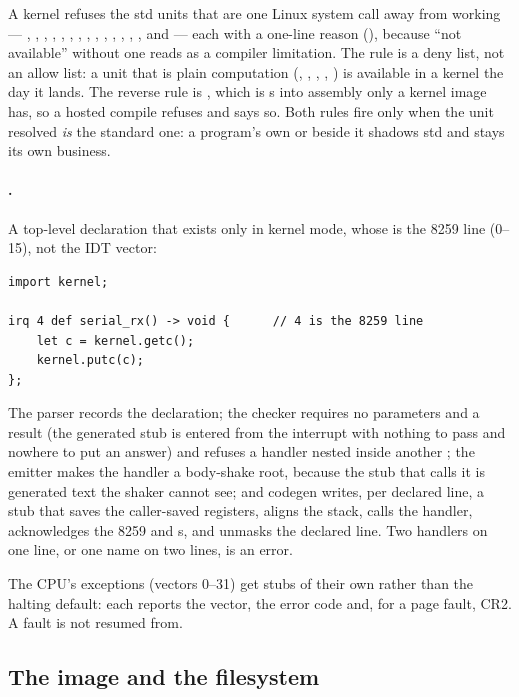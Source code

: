 A kernel refuses the std units that are one Linux system call away from
working --- , , , , , ,
, , , , , , ,
,  and  --- each with a one-line reason
(), because ``not available'' without one reads as a
compiler limitation. The rule is a deny list, not an allow list: a unit that
is plain computation (, , , , )
is available in a kernel the day it lands. The reverse rule is ,
which is s into assembly only a kernel image has, so a hosted compile
refuses  and says so. Both rules fire only when the unit
resolved \emph{is} the standard one: a program's own  or 
beside it shadows std and stays its own business.

\paragraph{.} A top-level declaration that exists only in kernel
mode, whose  is the 8259 line (0--15), not the IDT vector:

\begin{lstlisting}
import kernel;

irq 4 def serial_rx() -> void {      // 4 is the 8259 line
    let c = kernel.getc();
    kernel.putc(c);
};
\end{lstlisting}

\noindent The parser records the declaration; the checker requires no
parameters and a  result (the generated stub is entered from the
interrupt with nothing to pass and nowhere to put an answer) and refuses a
handler nested inside another ; the emitter makes the handler a
body-shake root, because the stub that calls it is generated text the shaker
cannot see; and codegen writes, per declared line, a stub that saves the
caller-saved registers, aligns the stack, calls the handler, acknowledges the
8259 and s, and unmasks the declared line. Two handlers on one line,
or one name on two lines, is an error.

The CPU's exceptions (vectors 0--31) get stubs of their own rather than the
halting default: each reports the vector, the error code and, for a page
fault, CR2. A fault is not resumed from.

\subsection{The image and the filesystem}

